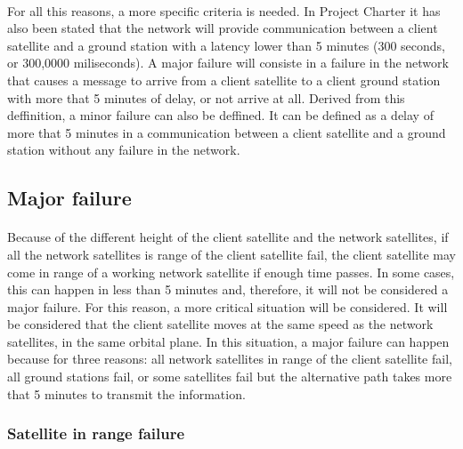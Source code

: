 \paragraph{}For all this reasons, a more specific criteria is needed. In Project Charter it has also been stated that the network will provide communication between a client satellite and a ground station with a latency lower than 5 minutes (300 seconds, or 300,0000 miliseconds). A major failure will consiste in a failure in the network that causes a message to arrive from a client satellite to a client ground station with more that 5 minutes of delay, or not arrive at all. Derived from this deffinition, a minor failure can also be deffined. It can be defined as a delay of more that 5 minutes in a communication between a client satellite and a ground station without any failure in the network.

\subsection{Major failure}

\paragraph{}Because of the different height of the client satellite and the network satellites, if all the network satellites is range of the client satellite fail, the client satellite may come in range of a working network satellite if enough time passes. In some cases, this can happen in less than 5 minutes and, therefore, it will not be considered a major failure. For this reason, a more critical situation will be considered. It will be considered that the client satellite moves at the same speed as the network satellites, in the same orbital plane. In this situation, a major failure can happen because for three reasons: all network satellites in range of the client satellite fail, all ground stations fail, or some satellites fail but the alternative path takes more that 5 minutes to transmit the information.

\subsubsection{Satellite in range failure}

